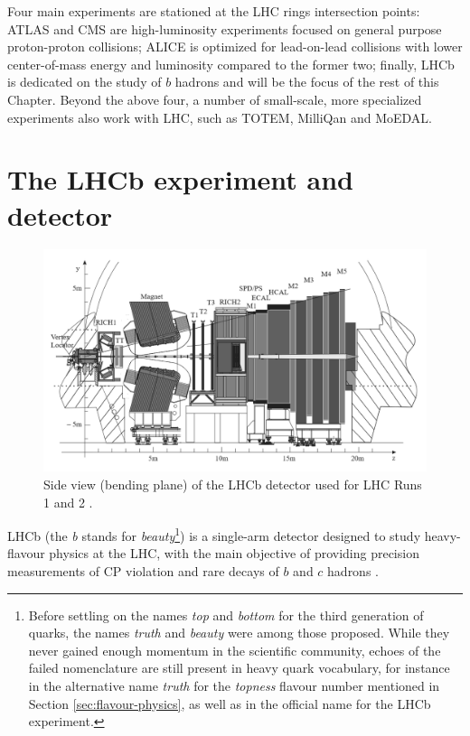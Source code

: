 Four main experiments are stationed at the LHC rings intersection points:
ATLAS and CMS are high-luminosity experiments focused on general purpose proton-proton collisions; ALICE is optimized for lead-on-lead collisions with lower center-of-mass energy and luminosity compared to the former two; finally, LHCb is dedicated on the study of $b$ hadrons and will be the focus of the rest of this Chapter.
Beyond the above four, a number of small-scale, more specialized experiments also work with LHC, such as TOTEM, MilliQan and MoEDAL.


\section{The LHCb experiment and detector}

\begin{figure}[t]
	\centering
	\includegraphics[width=\textwidth]{graphics/02-lhcb/lhcb_diagram.png}
	\caption[LHCb detector side view.]{Side view (bending plane) of the LHCb detector used for LHC Runs 1 and 2 \cite{Antunes-Nobrega:630827}.}
	\label{fig:2:lhcb_diagram}
\end{figure}

LHCb (the \textit{b} stands for \textit{beauty}\footnote{Before settling on the names \textit{top} and \textit{bottom} for the third generation of quarks, the names \textit{truth} and \textit{beauty} were among those proposed. While they never gained enough momentum in the scientific community, echoes of the failed nomenclature are still present in heavy quark vocabulary, for instance in the alternative name \textit{truth} for the \textit{topness} flavour number mentioned in Section \ref{sec:flavour-physics}, as well as in the official name for the LHCb experiment.}) is a single-arm detector designed to study heavy-flavour physics at the LHC, with the main objective of providing precision measurements of CP violation and rare decays of $b$ and $c$ hadrons \cite{Alves:1129809}.

